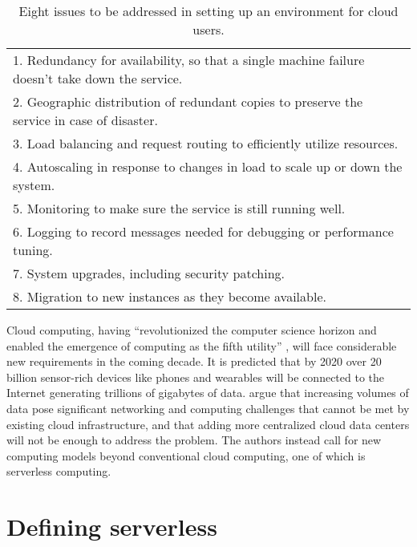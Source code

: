 \begin{table}[h!]
\centering
\begin{tabular}{|l|}
\hline
1. Redundancy for availability, so that a single machine failure doesn’t take down the service. \\
2. Geographic distribution of redundant copies to preserve the service in case of disaster. \\
3. Load balancing and request routing to efficiently utilize resources. \\
4. Autoscaling in response to changes in load to scale up or down the system. \\
5. Monitoring to make sure the service is still running well. \\
6. Logging to record messages needed for debugging or performance tuning. \\
7. System upgrades, including security patching. \\
8. Migration to new instances as they become available. \\
\hline
\end{tabular}
\caption{Eight issues to be addressed in setting up an environment for cloud users. \parencite{jonas19berkeleyView}}
\label{table:cloudIssues}
\end{table}

Cloud computing, having ``revolutionized the computer science horizon and enabled the emergence of computing as the fifth utility'' \parencite{buyya2017manifesto}, will face considerable new requirements in the coming decade. It is predicted that by 2020 over 20 billion sensor-rich devices like phones and wearables will be connected to the Internet generating trillions of gigabytes of data. \textcite{varghese18next} argue that increasing volumes of data pose significant networking and computing challenges that cannot be met by existing cloud infrastructure, and that adding more centralized cloud data centers will not be enough to address the problem. The authors instead call for new computing models beyond conventional cloud computing, one of which is serverless computing.

\section{Defining serverless} \label{sec:definingServerless}

